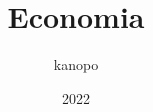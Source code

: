 \documentclass{article}
\begin{document}
    \author{kanopo}
    \title{Economia}
    \date{2022}

    \maketitle
    \tableofcontents

    \listoffigures
    \listoftables



    





\end{document}
